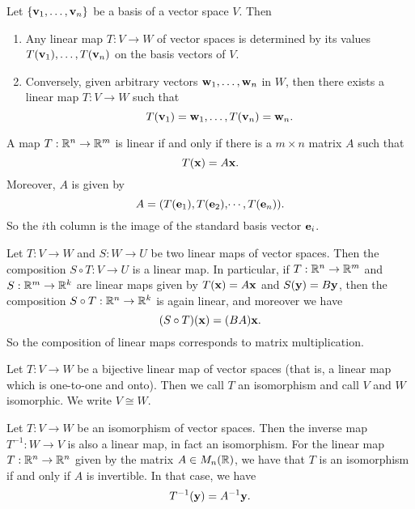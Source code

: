 \documentclass[10pt, a4paper]{article}
\begin{document}
\begin{lemma}
    Let $\{\mathbf{v}_1, \dotsc, \mathbf{v}_n\}$ be a basis of a vector space $V$.
    Then
    \begin{enumerate}[label = (\roman*)]
        \item Any linear map $T : V \rightarrow W$ of vector spaces is determined by its values $T(\mathbf{v}_1), \dotsc, T(\mathbf{v}_n)$ on the basis vectors of $V$.
        \item Conversely,
        given arbitrary vectors $\mathbf{w}_1, \dotsc, \mathbf{w}_n$ in $W$,
        then there exists a linear map $T : V \rightarrow W$ such that
        \[
        T(\mathbf{v}_1) = \mathbf{w}_1, \dotsc, T(\mathbf{v}_n) = \mathbf{w}_n.
        \]
    \end{enumerate}
\end{lemma}

\begin{lemma}
    A map $T : \mathbb{R} ^ n \rightarrow \mathbb{R} ^ m$ is linear if and only if there is a $m \times n$ matrix $A$ such that
    \[
    T(\mathbf{x}) = A\mathbf{x}.
    \]
    Moreover,
    $A$ is given by
    \[
    A = (T(\mathbf{e}_1), T(\mathbf{e}_2), \dotsi, T(\mathbf{e}_n)).
    \]
    So the $i$th column is the image of the standard basis vector $\mathbf{e}_i$.
\end{lemma}

\begin{lemma}
    Let $T : V \rightarrow W$ and $S : W \rightarrow U$ be two linear maps of vector spaces.
    Then the composition $S \circ T : V \rightarrow U$ is a linear map.
    In particular,
    if $T : \mathbb{R} ^ n \rightarrow \mathbb{R} ^ m$ and $S : \mathbb{R} ^ m \rightarrow \mathbb{R} ^ k$ are linear maps given by $T(\mathbf{x}) = A\mathbf{x}$ and $S(\mathbf{y}) = B\mathbf{y}$,
    then the composition $S \circ T : \mathbb{R} ^ n \rightarrow \mathbb{R} ^ k$ is again linear,
    and moreover we have
    \[
    (S \circ T)(\mathbf{x}) = (BA)\mathbf{x}.
    \]
    So the composition of linear maps corresponds to matrix multiplication.
\end{lemma}

\begin{definition}[Isomorphism]
    Let $T : V \rightarrow W$ be a bijective linear map of vector spaces
    (that is,
    a linear map which is one-to-one and onto).
    Then we call $T$ an isomorphism and call $V$ and $W$ isomorphic.
    We write $V \cong W$.
\end{definition}

\begin{lemma}
    Let $T : V \rightarrow W$ be an isomorphism of vector spaces.
    Then the inverse map $T ^ {-1} : W \rightarrow V$ is also a linear map,
    in fact an isomorphism.
    For the linear map $T : \mathbb{R} ^ n \rightarrow \mathbb{R} ^ n$ given by the matrix $A \in M_n(\mathbb{R})$,
    we have that $T$ is an isomorphism if and only if $A$ is invertible.
    In that case,
    we have
    \[
    T ^ {-1}(\mathbf{y}) = A ^ {-1}\mathbf{y}.
    \]
\end{lemma}
\end{document}
